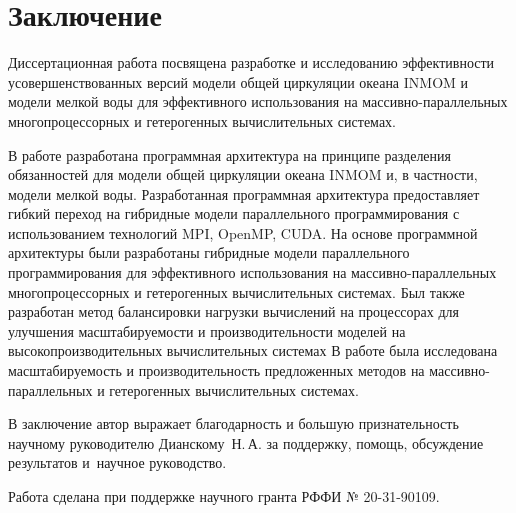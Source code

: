 \chapter*{Заключение}                       %


Диссертационная работа посвящена разработке и исследованию эффективности усовершенствованных версий модели общей циркуляции океана INMOM и модели мелкой воды для эффективного использования на массивно-параллельных многопроцессорных и гетерогенных вычислительных системах.

В работе разработана программная архитектура на принципе разделения обязанностей для модели общей циркуляции океана INMOM и, в частности,  модели мелкой воды. Разработанная программная архитектура предоставляет гибкий переход на гибридные модели параллельного программирования с использованием технологий MPI, OpenMP, CUDA.
На основе программной архитектуры были разработаны гибридные модели параллельного программирования для эффективного использования на массивно-параллельных многопроцессорных и гетерогенных вычислительных системах.
Был также разработан метод балансировки нагрузки вычислений на процессорах для улучшения масштабируемости и производительности моделей на высокопроизводительных вычислительных системах
В работе была исследована масштабируемость и производительность предложенных методов на массивно-параллельных и гетерогенных вычислительных системах.

%



В заключение автор выражает благодарность и большую признательность научному руководителю Дианскому~Н.\,А. за поддержку, помощь, обсуждение результатов и~научное руководство.

Работа сделана при поддержке научного гранта РФФИ № 20-31-90109.